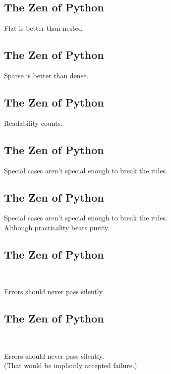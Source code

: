 \documentclass[xga]{xdvislides}
\begin{document}
\subsection{The Zen of Python}
\begin{center}
    Flat is better than nested.
\end{center}

\subsection{The Zen of Python}
\begin{center}
    Sparse is better than dense.
\end{center}

\subsection{The Zen of Python}
\begin{center}
    Readability counts.
\end{center}

\subsection{The Zen of Python}
\begin{center}
    Special cases aren't special enough to break the rules.
\end{center}

\subsection{The Zen of Python}
\begin{center}
    Special cases aren't special enough to break the rules. \\
\addvspace{.5in}
    Although practicality beats purity.
\end{center}

\subsection{The Zen of Python}
\\
\begin{center}
    Errors should never pass silently.
\end{center}

\subsection{The Zen of Python}
\\
\begin{center}
    Errors should never pass silently. \\
\addvspace{.2in}
	\small
	(That would be implicitly accepted failure.)
\end{center}
\Huge
\end{document}
